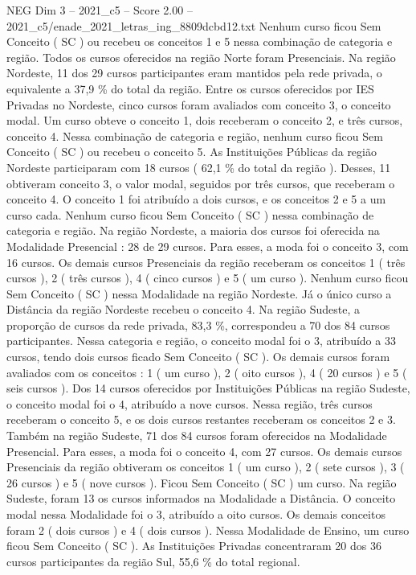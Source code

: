\begin{textsample}{NEG Dim 3 – 2021\_c5 – Score 2.00 – 2021\_c5/enade\_2021\_letras\_ing\_8809dcbd12.txt}
Nenhum curso ficou Sem Conceito ( SC ) ou recebeu os conceitos 1 e 5 nessa combinação de categoria e região.
Todos os cursos oferecidos na região Norte foram Presenciais.
Na região Nordeste, 11 dos 29 cursos participantes eram mantidos pela rede privada, o equivalente a 37,9 \% do total da região.
Entre os cursos oferecidos por IES Privadas no Nordeste, cinco cursos foram avaliados com conceito 3, o conceito modal.
Um curso obteve o conceito 1, dois receberam o conceito 2, e três cursos, conceito 4.
Nessa combinação de categoria e região, nenhum curso ficou Sem Conceito ( SC ) ou recebeu o conceito 5.
As Instituições Públicas da região Nordeste participaram com 18 cursos ( 62,1 \% do total da região ).
Desses, 11 obtiveram conceito 3, o valor modal, seguidos por três cursos, que receberam o conceito 4.
O conceito 1 foi atribuído a dois cursos, e os conceitos 2 e 5 a um curso cada.
Nenhum curso ficou Sem Conceito ( SC ) nessa combinação de categoria e região.
Na região Nordeste, a maioria dos cursos foi oferecida na Modalidade Presencial : 28 de 29 cursos.
Para esses, a moda foi o conceito 3, com 16 cursos.
Os demais cursos Presenciais da região receberam os conceitos 1 ( três cursos ), 2 ( três cursos ), 4 ( cinco cursos ) e 5 ( um curso ).
Nenhum curso ficou Sem Conceito ( SC ) nessa Modalidade na região Nordeste.
Já o único curso a Distância da região Nordeste recebeu o conceito 4.
Na região Sudeste, a proporção de cursos da rede privada, 83,3 \%, correspondeu a 70 dos 84 cursos participantes.
Nessa categoria e região, o conceito modal foi o 3, atribuído a 33 cursos, tendo dois cursos ficado Sem Conceito ( SC ).
Os demais cursos foram avaliados com os conceitos : 1 ( um curso ), 2 ( oito cursos ), 4 ( 20 cursos ) e 5 ( seis cursos ).
Dos 14 cursos oferecidos por Instituições Públicas na região Sudeste, o conceito modal foi o 4, atribuído a nove cursos.
Nessa região, três cursos receberam o conceito 5, e os dois cursos restantes receberam os conceitos 2 e 3.
Também na região Sudeste, 71 dos 84 cursos foram oferecidos na Modalidade Presencial.
Para esses, a moda foi o conceito 4, com 27 cursos.
Os demais cursos Presenciais da região obtiveram os conceitos 1 ( um curso ), 2 ( sete cursos ), 3 ( 26 cursos ) e 5 ( nove cursos ).
Ficou Sem Conceito ( SC ) um curso.
Na região Sudeste, foram 13 os cursos informados na Modalidade a Distância.
O conceito modal nessa Modalidade foi o 3, atribuído a oito cursos.
Os demais conceitos foram 2 ( dois cursos ) e 4 ( dois cursos ).
Nessa Modalidade de Ensino, um curso ficou Sem Conceito ( SC ).
As Instituições Privadas concentraram 20 dos 36 cursos participantes da região Sul, 55,6 \% do total regional.

\end{textsample}
